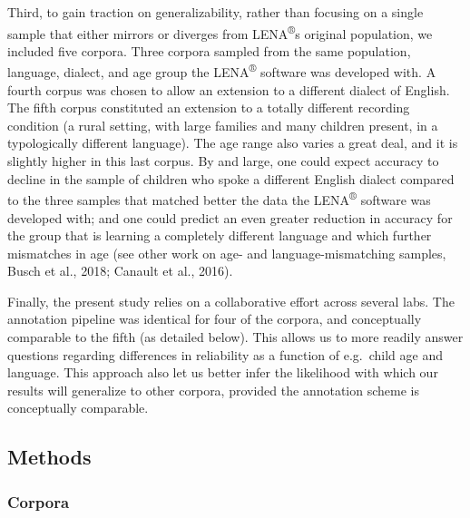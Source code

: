 \documentclass[english,table,man,floatsintext]{apa6}
\begin{document}
Third, to gain traction on generalizability, rather than focusing on a single sample that either mirrors or diverges from LENA\textsuperscript{®}s original population, we included five corpora. Three corpora sampled from the same population, language, dialect, and age group the LENA\textsuperscript{®} software was developed with. A fourth corpus was chosen to allow an extension to a different dialect of English. The fifth corpus constituted an extension to a totally different recording condition (a rural setting, with large families and many children present, in a typologically different language). The age range also varies a great deal, and it is slightly higher in this last corpus. By and large, one could expect accuracy to decline in the sample of children who spoke a different English dialect compared to the three samples that matched better the data the LENA\textsuperscript{®} software was developed with; and one could predict an even greater reduction in accuracy for the group that is learning a completely different language and which further mismatches in age (see other work on age- and language-mismatching samples, Busch et al., 2018; Canault et al., 2016).

Finally, the present study relies on a collaborative effort across several labs. The annotation pipeline was identical for four of the corpora, and conceptually comparable to the fifth (as detailed below). This allows us to more readily answer questions regarding differences in reliability as a function of e.g.~child age and language. This approach also let us better infer the likelihood with which our results will generalize to other corpora, provided the annotation scheme is conceptually comparable.

\hypertarget{methods}{%
\subsection{Methods}\label{methods}}

\hypertarget{corpora}{%
\subsubsection{Corpora}\label{corpora}}
\end{document}
